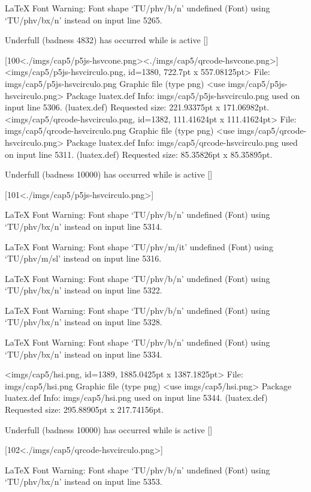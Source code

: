 LaTeX Font Warning: Font shape `TU/phv/b/n' undefined
(Font)              using `TU/phv/bx/n' instead on input line 5265.


Underfull \vbox (badness 4832) has occurred while \output is active []

[100<./imgs/cap5/p5js-hsvcone.png><./imgs/cap5/qrcode-hsvcone.png>]
<imgs/cap5/p5js-hsvcirculo.png, id=1380, 722.7pt x 557.08125pt>
File: imgs/cap5/p5js-hsvcirculo.png Graphic file (type png)
<use imgs/cap5/p5js-hsvcirculo.png>
Package luatex.def Info: imgs/cap5/p5js-hsvcirculo.png  used on input line 5306.
(luatex.def)             Requested size: 221.93375pt x 171.06982pt.
<imgs/cap5/qrcode-hsvcirculo.png, id=1382, 111.41624pt x 111.41624pt>
File: imgs/cap5/qrcode-hsvcirculo.png Graphic file (type png)
<use imgs/cap5/qrcode-hsvcirculo.png>
Package luatex.def Info: imgs/cap5/qrcode-hsvcirculo.png  used on input line 5311.
(luatex.def)             Requested size: 85.35826pt x 85.35895pt.

Underfull \vbox (badness 10000) has occurred while \output is active []

[101<./imgs/cap5/p5js-hsvcirculo.png>]

LaTeX Font Warning: Font shape `TU/phv/b/n' undefined
(Font)              using `TU/phv/bx/n' instead on input line 5314.


LaTeX Font Warning: Font shape `TU/phv/m/it' undefined
(Font)              using `TU/phv/m/sl' instead on input line 5316.


LaTeX Font Warning: Font shape `TU/phv/b/n' undefined
(Font)              using `TU/phv/bx/n' instead on input line 5322.


LaTeX Font Warning: Font shape `TU/phv/b/n' undefined
(Font)              using `TU/phv/bx/n' instead on input line 5328.


LaTeX Font Warning: Font shape `TU/phv/b/n' undefined
(Font)              using `TU/phv/bx/n' instead on input line 5334.

<imgs/cap5/hsi.png, id=1389, 1885.0425pt x 1387.1825pt>
File: imgs/cap5/hsi.png Graphic file (type png)
<use imgs/cap5/hsi.png>
Package luatex.def Info: imgs/cap5/hsi.png  used on input line 5344.
(luatex.def)             Requested size: 295.88905pt x 217.74156pt.

Underfull \vbox (badness 10000) has occurred while \output is active []

[102<./imgs/cap5/qrcode-hsvcirculo.png>]

LaTeX Font Warning: Font shape `TU/phv/b/n' undefined
(Font)              using `TU/phv/bx/n' instead on input line 5353.

